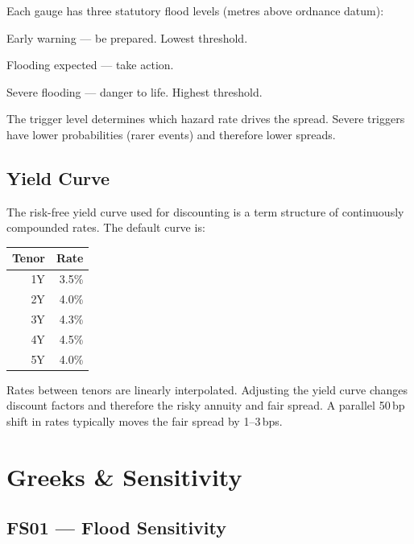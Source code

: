 \documentclass[11pt,a4paper]{article}
\begin{document}
Each gauge has three statutory flood levels (metres above ordnance datum):

\begin{description}[leftmargin=2em]
  \item[Flood Alert] Early warning --- be prepared. Lowest threshold.
  \item[Flood Warning] Flooding expected --- take action.
  \item[Severe Flood Warning] Severe flooding --- danger to life. Highest threshold.
\end{description}

\noindent The trigger level determines which hazard rate drives the
spread.  Severe triggers have lower probabilities (rarer events) and
therefore lower spreads.

\subsection{Yield Curve}

The risk-free yield curve used for discounting is a term structure of
continuously compounded rates.  The default curve is:

\begin{center}
\begin{tabular}{rr}
\toprule
\textbf{Tenor} & \textbf{Rate} \\
\midrule
1Y & 3.5\% \\
2Y & 4.0\% \\
3Y & 4.3\% \\
4Y & 4.5\% \\
5Y & 4.0\% \\
\bottomrule
\end{tabular}
\end{center}

\noindent Rates between tenors are linearly interpolated.  Adjusting the
yield curve changes discount factors and therefore the risky annuity and
fair spread.  A parallel 50\,bp shift in rates typically moves the fair
spread by 1--3\,bps.


\section{Greeks \& Sensitivity}

\subsection{FS01 --- Flood Sensitivity}
\end{document}
